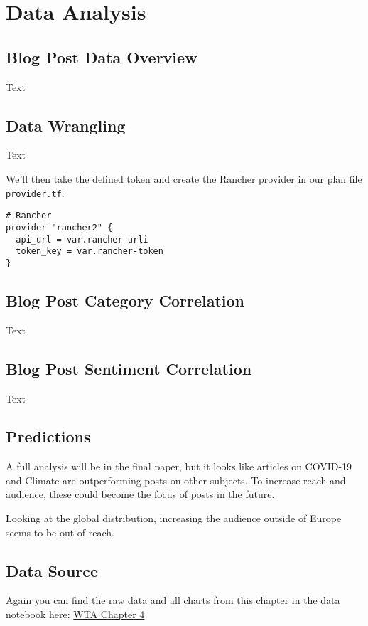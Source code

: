 %
%

\pagebreak
\section{Data Analysis}

\onehalfspacing

\subsection{Blog Post Data Overview}

Text

\subsection{Data Wrangling}

Text

We'll then take the defined token and create the Rancher provider in our plan file \verb|provider.tf|:

\begin{lstlisting}[caption=Rancher Provider, frame=single, basicstyle=\ttfamily]
# Rancher
provider "rancher2" {
  api_url = var.rancher-urli
  token_key = var.rancher-token
}
\end{lstlisting}

\subsection{Blog Post Category Correlation}

Text 

\subsection{Blog Post Sentiment Correlation}

Text

\subsection{Predictions}

A full analysis will be in the final paper, but it looks like articles on COVID-19 and Climate are outperforming posts on other subjects. To increase reach and audience, these could become the focus of posts in the future.

Looking at the global distribution, increasing the audience outside of Europe seems to be out of reach.

\subsection{Data Source}

Again you can find the raw data and all charts from this chapter in the data notebook here: \href{https://plausible.io/chfrank.net}{WTA Chapter 4}

